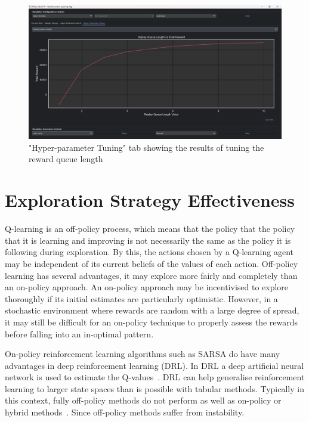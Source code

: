 \documentclass[]{final_report}
\begin{document}
\begin{figure}[H]
  \centering
  
  \includegraphics[trim={0 0 0 6mm},clip,width=\textwidth]{ui-screenshots/hyper-tuning.png}
  
  \caption{\label{fig:screenshot:current-state} "Hyper-parameter Tuning" tab showing the results of tuning the reward queue length}
\end{figure}


\chapter{Exploration Strategy Effectiveness}

Q-learning is an off-policy process, which means that the policy that the policy that it is learning and improving is not necessarily the same as the policy it is following during exploration. By this, the actions chosen by a Q-learning agent may be independent of its current beliefs of the values of each action. Off-policy learning has several advantages, it may explore more fairly and completely than an on-policy approach. An on-policy approach may be incentivised to explore thoroughly if its initial estimates are particularly optimistic. However, in a stochastic environment where rewards are random with a large degree of spread, it may still be difficult for an on-policy technique to properly assess the rewards before falling into an in-optimal pattern.  

On-policy reinforcement learning algorithms such as SARSA do have many advantages in deep reinforcement learning (DRL). In DRL a deep artificial neural network is used to estimate the Q-values~\cite{deepRLOverview}. DRL can help generalise reinforcement learning to larger state spaces than is possible with tabular methods. Typically in this context, fully off-policy methods do not perform as well as on-policy or hybrid methods~\cite{deepOnVsOffPolicy}. Since off-policy methods suffer from instability\cite{sutton2018reinforcement}.
\end{document}
